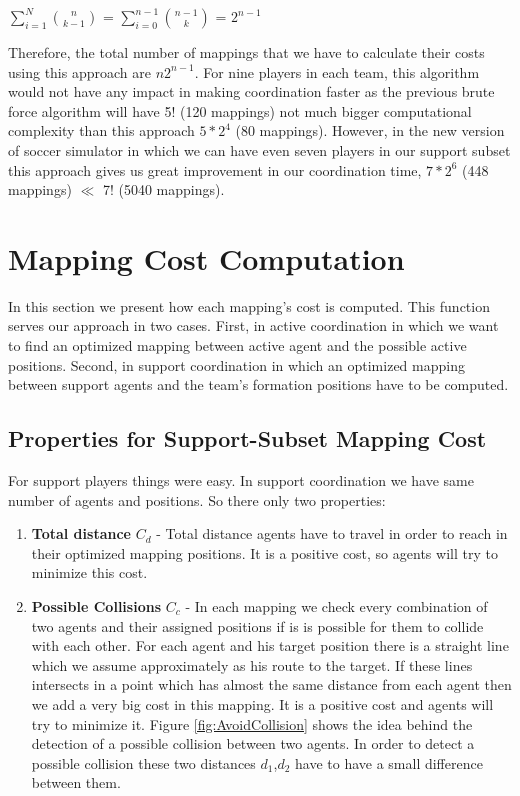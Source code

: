 \begin{center}
$\sum\limits_{i=1}^N{{n}\choose{k-1}}$ = $\sum\limits_{i=0}^{n-1}{{n-1}\choose{k}}$ = $2^{n-1}$
\end{center}
Therefore, the total number of mappings that we have to calculate their costs using this approach are $n2^{n-1}$. For nine players in each team, this algorithm would not have any impact in making coordination faster as the previous brute force algorithm will have 5! (120 mappings) not much bigger computational complexity than this approach $5 \ast 2^{4}$ (80 mappings). However, in the new version of soccer simulator in which we can have even seven players in our support subset this approach gives us great improvement in our coordination time, $7 \ast 2^{6}$ (448 mappings) $\ll$ 7! (5040 mappings).

\section{Mapping Cost Computation}
In this section we present how each mapping's cost is computed. This function serves our approach in two cases. First, in active coordination in which we want to find an optimized mapping between active agent and the possible active positions. Second, in support coordination in which an optimized mapping between support agents and the team's formation positions have to be computed.

\subsection{Properties for Support-Subset Mapping Cost}
For support players things were easy. In support coordination we have same number of agents and positions. So there only two properties:  
\begin{enumerate}
\item \textbf{Total distance }$C_{d}$ - Total distance agents have to travel in order to reach in their optimized mapping positions. It is a positive cost, so agents will try to minimize this cost.
\item \textbf{Possible Collisions }$C_{c}$ - In each mapping we check every combination of two agents and their assigned positions if is is possible for them to collide with each other. For each agent and his target position there is a straight line which we assume approximately as his route to the target. If these lines intersects in a point which has almost the same distance from each agent then we add a very big cost in this mapping. It is a positive cost and agents will try to minimize it. Figure \ref{fig:AvoidCollision} shows the idea behind the detection of a possible collision between two agents. In order to detect a possible collision these two distances $d_{1}$,$d_{2}$ have to have a small difference between them.
\end{enumerate}


